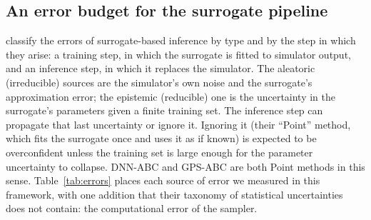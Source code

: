 \documentclass[sn-basic,iicol,pdflatex]{sn-jnl}
\begin{document}
\begin{table}[!t]
\centering
\caption{Samplers for the same surrogate posterior, over the $364$ of $500$ prior draws with $\bar d>0$ (binomial s.e.\ of a coverage near $0.95$ is $0.011$; an asterisk marks a coverage more than two s.e.\ from $0.95$). Contraction is the share of prior variance removed. $^{\dagger}$ Divergent transitions in most data sets; see the text}
\label{tab:repairs}
\scriptsize\setlength{\tabcolsep}{3pt}

\end{table}

\subsection{An error budget for the surrogate pipeline}
\label{sec:errors}

\citet{reiser2025} classify the errors of surrogate-based inference by type and by the step in which they arise: a training step, in which the surrogate is fitted to simulator output, and an inference step, in which it replaces the simulator.
The aleatoric (irreducible) sources are the simulator's own noise and the surrogate's approximation error; the epistemic (reducible) one is the uncertainty in the surrogate's parameters given a finite training set. The inference step can propagate that last
uncertainty or ignore it. Ignoring it (their ``Point'' method, which fits the surrogate once and uses it as if known) is expected to be overconfident unless the training set is large enough for the parameter uncertainty to collapse. DNN-ABC and GPS-ABC are both Point methods in this sense.
Table~\ref{tab:errors} places each source of error we measured in this framework, with one addition that their taxonomy of statistical uncertainties does not contain: the computational error of the sampler.
\end{document}
